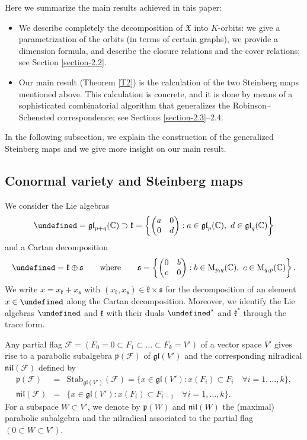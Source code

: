 \documentclass[11pt]{article}
\providecommand{\fg}{\nobreakspace»}
\theoremstyle{definition}
\numberwithin{equation}{section}
\let\fg\undefined
\newcommand{\fk}{\mathfrak{k}}
\newcommand{\fs}{\mathfrak{s}}
\newcommand{\fg}{\mathfrak{g}}
\newcommand{\fp}{\mathfrak{p}}
\newcommand{\gl}{\mathfrak{gl}}
\newcommand{\nil}{\mathfrak{nil}}
\newcommand{\Mat}{\mathrm{M}}
\newcommand{\flag}{\mathcal{F}}
\newcommand{\Xfv}{\mathfrak{X}}
\newcommand{\mC}{\mathbb{C}}
\begin{document}
Here we summarize the main results achieved in this paper:
\begin{itemize}
\item We describe completely the decomposition of $\Xfv$ into $K$-orbits: we give a para\-metrization of the orbits (in terms of certain graphs), we provide a dimension formula, and describe the closure relations and the cover relations; see Section \ref{section-2.2}.
\item Our main result (Theorem \ref{T2}) is the calculation of the two Steinberg maps mentioned above. This calculation is concrete, and it is done by means of a sophisticated combinatorial algorithm that generalizes the Robinson--Schensted correspondence; see Sections \ref{section-2.3}--2.4.
\end{itemize}
In the following subsection, we explain the construction of the generalized Steinberg maps and we give more insight on our main result.

\subsection{Conormal variety and Steinberg maps}
\label{section-1.2}
We consider the Lie algebras
\[
\fg=\gl_{p+q}(\mC)\supset\fk=\left\{\begin{pmatrix} a & 0\\ 0 & d \end{pmatrix}:a\in\gl_p(\mC),\ d\in\gl_q(\mC)\right\}
\]
and a Cartan decomposition
\[
\fg=\fk\oplus\fs\qquad\mbox{where}\qquad\fs=\left\{\begin{pmatrix} 0 & b\\ c & 0 \end{pmatrix}:b\in\Mat_{p,q}(\mC),\ c\in\Mat_{q,p}(\mC)\right\}.
\]
We write $x=x_\fk+x_\fs$ with $(x_\fk,x_\fs)\in\fk\times\fs$ for the decomposition of an element $x\in\fg$ along the Cartan decomposition.
Moreover, we identify the Lie algebras $\fg$ and $\fk$ with their duals $\fg^*$ and $\fk^*$ through the trace form.

Any partial flag $\flag=(F_0=0\subset F_1\subset\ldots\subset F_k=V')$ of a vector space $V'$ gives rise to a parabolic subalgebra $\fp(\flag)$ of $\gl(V')$ and the corresponding nilradical $\nil(\flag)$ defined by
\begin{eqnarray*}
\fp(\flag) & = & \mathrm{Stab}_{\gl(V')}(\flag)=\{x\in\gl(V'):x(F_i)\subset F_i\quad \forall i=1,\ldots,k\},\\
\nil(\flag) & = & \{x\in\gl(V'):x(F_i)\subset F_{i-1}\quad\forall i=1,\ldots,k\}.
\end{eqnarray*}
For a subspace $W\subset V'$, we denote by $\fp(W)$ and $\nil(W)$ the (maximal) parabolic subalgebra and the nilradical associated to the partial flag $(0\subset W\subset V')$.
\end{document}
